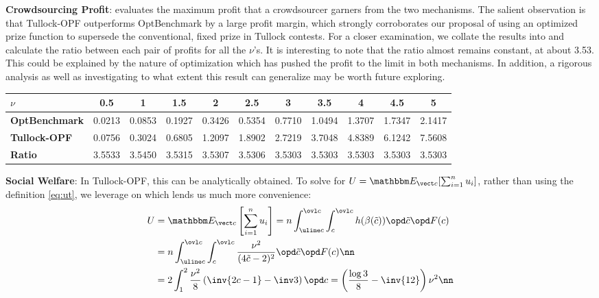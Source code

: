 \documentclass{sig-alternate-10pt}
\begin{document}
{\bf Crowdsourcing Profit}:  evaluates the maximum profit that a crowdsourcer garners from the two mechanisms. The salient observation is that Tullock-OPF outperforms OptBenchmark by a large profit margin, which strongly corroborates our proposal of using an optimized prize function to supersede the conventional, fixed prize in Tullock contests. For a closer examination, we collate the results into  and calculate the ratio between each pair of profits for all the $\nu$'s. It is interesting to note that the ratio almost remains constant, at about 3.53. This could be explained by the nature of optimization which has pushed the profit to the limit in both mechanisms. In addition, a rigorous analysis as well as investigating to what extent this result can generalize may be worth future exploring.
\begin{table*}[ht]
\caption{Profit Comparison and Ratios}\label{tab:profit}
\centering
\begin{tabular}{l | c | c | c | c | c | c | c | c | c | c } \hline\hline 
{\bf $\nu$} & 0.5 & 1 & 1.5 & 2 & 2.5 & 3 & 3.5 & 4 & 4.5 & 5 \\ \hline 
{\bf OptBenchmark} &  0.0213 & 0.0853 & 0.1927 & 0.3426 & 0.5354 & 0.7710 & 1.0494 & 1.3707 & 1.7347 & 2.1417 \\ \hline
{\bf Tullock-OPF} &  0.0756 & 0.3024 & 0.6805 & 1.2097 & 1.8902 & 2.7219 & 3.7048 & 4.8389 & 6.1242 & 7.5608 \\ \hline
{\bf Ratio} &  3.5533 & 3.5450 & 3.5315 & 3.5307 & 3.5306 & 3.5303 & 3.5303 & 3.5303 & 3.5303 & 3.5303 \\ \hline\hline
\end{tabular}
\end{table*}

{\bf Social Welfare}: In Tullock-OPF, this can be analytically obtained. To solve for $U = \mathbbm E_{\vect c}[\sum_{i=1}^n u_i]$, rather than using the definition \eqref{eq:ut}, we leverage on  which lends us much more convenience:
\begin{align}
U &= \mathbbm E_{\vect c}\left[\sum_{i=1}^n u_i\right] = n \int_{\uline c}^{\ovl c} \int_{c}^{\ovl c} h(\beta(\tilde c)) \opd \tilde c \opd F(c) \label{eq:socwf}\\
&= n \int_{\uline c}^{\ovl c} \int_{c}^{\ovl c} \frac{\nu^2}{(4\tilde c -2)^2} \opd \tilde c \opd F(c) \nn\\
&= 2 \int_1^2 \frac{\nu^2}{8} \left(\inv{2c-1} - \inv 3\right) \opd c 
= \left(\frac{\log 3}{8} - \inv{12}\right) \nu^2 \nn
\end{align}
\end{document}
